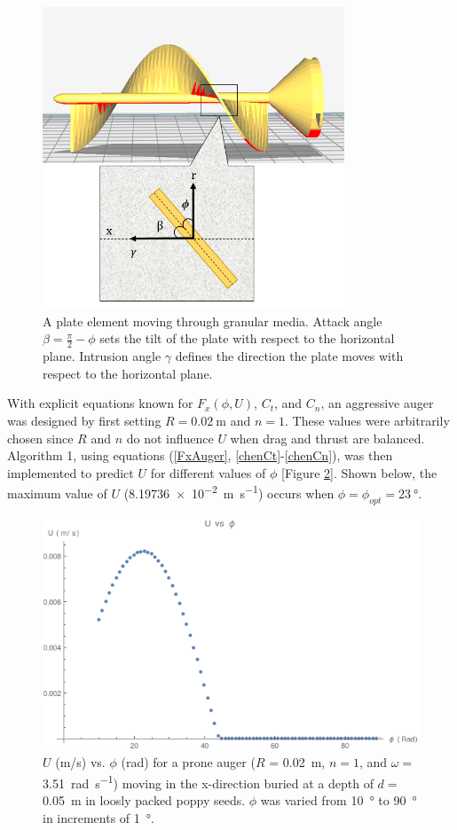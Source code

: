 \documentclass[letterpaper, 11 pt]{article}
\begin{document}
\begin{figure}[H]
\centering
\includegraphics[height=9cm]{./imgs/helix_plate}
\caption{A plate element moving through granular media. Attack angle $\beta = \frac{\pi}{2} - \phi$ sets the tilt of the plate with respect to the horizontal plane. Intrusion angle $\gamma$ defines the direction the plate moves with respect to the horizontal plane. }
\label{fig:helix_plate}
\end{figure}

With explicit equations known for $F_x(\phi,U)$, $C_t$, and $C_n$, an aggressive auger was designed by first setting $R = \SI{0.02}{\m}$ and $n = 1$. These values were arbitrarily chosen since $R$ and $n$ do not influence $U$ when drag and thrust are balanced. Algorithm 1, using equations (\ref{FxAuger}, \ref{chenCt}-\ref{chenCn}), was then implemented to predict $U$ for different values of $\phi$ [Figure \ref{fig:UvPhi}]. Shown below, the maximum value of $U$ (\SI[per-mode=fraction]{8.19736e-2}{\m\per\s}) occurs when $\phi = \phi_{opt} = \SI{23}{\degree}$.   
\begin{figure}[H]
\centering
\includegraphics[width=0.7\linewidth]{./imgs/UvPhi}
\caption{$U$ (\si{\m/\s}) vs. $\phi$ (\si{\radian}) for a prone auger ($R$ = \SI{0.02}{\m}, $n = 1$, and $\omega = $ \SI[per-mode=fraction]{3.51}{\radian\per\s}) moving in the x-direction buried at a depth of $d =$ \SI{0.05}{\m} in loosly packed poppy seeds. $\phi$ was varied from \SI{10}{\degree} to \SI{90}{\degree} in increments of \SI{1}{\degree}.}
\label{fig:UvPhi}
\end{figure}
 
\end{document}
